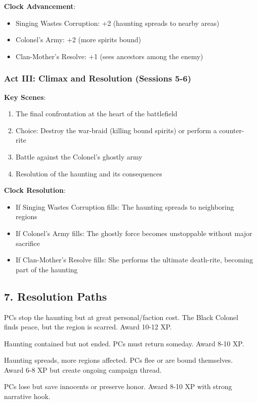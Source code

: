 \documentclass[11pt]{article}
\begin{document}
\textbf{Clock Advancement}:
\begin{itemize}[leftmargin=*]
\item Singing Wastes Corruption: +2 (haunting spreads to nearby areas)
\item Colonel's Army: +2 (more spirits bound)
\item Clan-Mother's Resolve: +1 (sees ancestors among the enemy)
\end{itemize}

\subsubsection*{Act III: Climax and Resolution (Sessions 5-6)}

\textbf{Key Scenes}:
\begin{enumerate}[leftmargin=*]
\item The final confrontation at the heart of the battlefield
\item Choice: Destroy the war-braid (killing bound spirits) or perform a counter-rite
\item Battle against the Colonel's ghostly army
\item Resolution of the haunting and its consequences
\end{enumerate}

\textbf{Clock Resolution}:
\begin{itemize}[leftmargin=*]
\item If Singing Wastes Corruption fills: The haunting spreads to neighboring regions
\item If Colonel's Army fills: The ghostly force becomes unstoppable without major sacrifice
\item If Clan-Mother's Resolve fills: She performs the ultimate death-rite, becoming part of the haunting
\end{itemize}

\subsection*{7. Resolution Paths}

\begin{description}[leftmargin=*]
\item[Victory (High Cost)] PCs stop the haunting but at great personal/faction cost. The Black Colonel finds peace, but the region is scarred. Award 10-12 XP.
\item[Compromise] Haunting contained but not ended. PCs must return someday. Award 8-10 XP.
\item[Failure] Haunting spreads, more regions affected. PCs flee or are bound themselves. Award 6-8 XP but create ongoing campaign thread.
\item[Noble Failure] PCs lose but save innocents or preserve honor. Award 8-10 XP with strong narrative hook.
\end{description}
\end{document}

